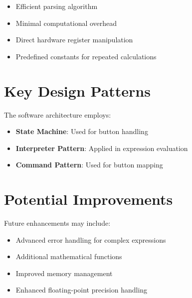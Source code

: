 \documentclass[journal]{IEEEtran}
\numberwithin{equation}{enumi}
\numberwithin{figure}{enumi}
\begin{document}
\begin{itemize}
    \item Efficient parsing algorithm
    \item Minimal computational overhead
    \item Direct hardware register manipulation
    \item Predefined constants for repeated calculations
\end{itemize}

\section{Key Design Patterns}

The software architecture employs:

\begin{itemize}
    \item \textbf{State Machine}: Used for button handling
    \item \textbf{Interpreter Pattern}: Applied in expression evaluation
    \item \textbf{Command Pattern}: Used for button mapping
\end{itemize}

\section{Potential Improvements}

Future enhancements may include:

\begin{itemize}
    \item Advanced error handling for complex expressions
    \item Additional mathematical functions
    \item Improved memory management
    \item Enhanced floating-point precision handling
\end{itemize}
\end{document}
